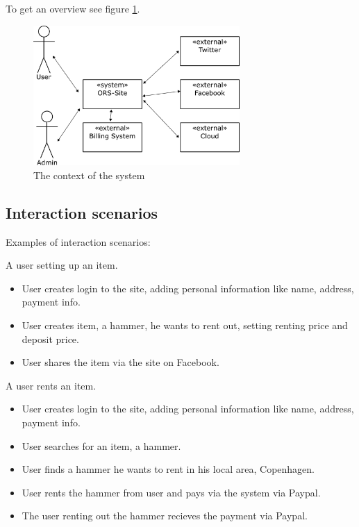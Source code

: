 \documentclass[a4paper,11pt]{report}
\begin{document}
To get an overview see figure \ref{fig:context}.

\begin{figure}[h!]
  \centering
  \includegraphics[width=0.7\textwidth]{figures/context_drawing}
  \caption{The context of the system}
  \label{fig:context}
\end{figure}




\subsection{Interaction scenarios}
\label{sec:inter-scen}
Examples of interaction scenarios:

A user setting up an item.
\begin{itemize}
  \item User creates login to the site, adding personal information like name, address, payment info.
  \item User creates item, a hammer, he wants to rent out, setting renting price and deposit price.
  \item User shares the item via the site on Facebook.
\end{itemize}

A user rents an item.
\begin{itemize}
  \item User creates login to the site, adding personal information like name, address, payment info.
  \item User searches for an item, a hammer.
  \item User finds a hammer he wants to rent in his local area, Copenhagen.
  \item User rents the hammer from user and pays via the system via Paypal.
  \item The user renting out the hammer recieves the payment via Paypal.
\end{itemize}
\end{document}
